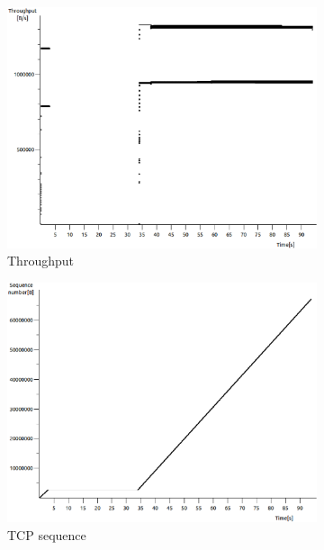 \documentclass[conference,a4paper]{../../sty/IEEEtran}
\begin{document}
\begin{figure}
 \centering
 \begin{subfigure}[b]{0.2\textwidth}
  \includegraphics[width=\textwidth]{s6-0_th}
  \caption{Throughput}
 \end{subfigure}
 \begin{subfigure}[b]{0.2\textwidth}
  \includegraphics[width=\textwidth]{s6-0_seq}
  \caption{TCP sequence}
 \end{subfigure}
 \begin{subfigure}[b]{0.2\textwidth}

\end{subfigure}
\end{figure}
\end{document}
